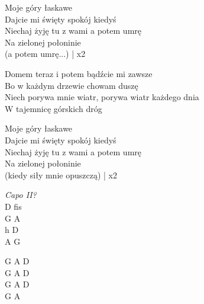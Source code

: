 \begin{text}
    \chordfill
    Moje góry łaskawe\\
    Dajcie mi święty spokój kiedyś\\
    Niechaj żyję tu z wami a potem umrę\\
    Na zielonej połoninie\\
    (a potem umrę...) | x2

    Domem teraz i potem bądźcie mi zawsze\\
    Bo w każdym drzewie chowam duszę\\
    Niech porywa mnie wiatr, porywa wiatr każdego dnia\\
    W tajemnicę górskich dróg

    Moje góry łaskawe\\
    Dajcie mi święty spokój kiedyś\\
    Niechaj żyję tu z wami a potem umrę\\
    Na zielonej połoninie\\
    (kiedy siły mnie opuszczą) | x2
\end{text}
\begin{chord}
    \textit{Capo II?}\\
    D fis\\
    G A\\
    h D\\
    A G

    \hfill\break
    G A D\\
    G A D\\
    G A D\\
    G A
\end{chord}